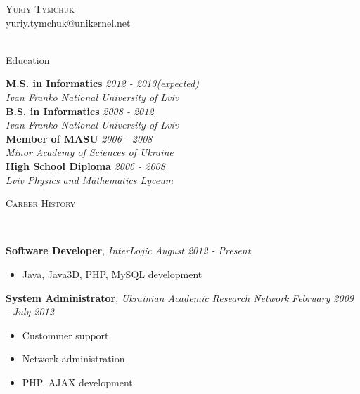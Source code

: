 \documentclass[9pt]{article}
\newenvironment{changemargin}[2]{%
  \begin{list}{}{%
    \setlength{\topsep}{0pt}%
    \setlength{\leftmargin}{#1}%
    \setlength{\rightmargin}{#2}%
    \setlength{\listparindent}{\parindent}%
    \setlength{\itemindent}{\parindent}%
    \setlength{\parsep}{\parskip}%
  }%
  \item[]}{\end{list}
}
\newcommand{\lineover}{
	\begin{changemargin}{-0.05in}{-0.05in}
		\vspace*{-8pt}
		\hrulefill \\
		\vspace*{-2pt}
	\end{changemargin}
}
\newcommand{\header}[1]{
	\begin{changemargin}{-0.5in}{-0.5in}
		\scshape{#1}\\
  	\lineover
	\end{changemargin}
}
\newcommand{\contact}[4]{
	\begin{changemargin}{-0.5in}{-0.5in}
		\begin{center}
			{\Large \scshape {#1}}\\ \smallskip
			{#2}\\ \smallskip 
			{#3}\\ \smallskip
			{#4}\smallskip
		\end{center}
	\end{changemargin}
}
\newenvironment{body} {
	\vspace*{-16pt}
	\begin{changemargin}{-0.25in}{-0.5in}
  }	
	{\end{changemargin}
}
\begin{document}
\contact{Yuriy Tymchuk}{yuriy.tymchuk@unikernel.net}{\hspace*{\fill}}



\header{Education}

\begin{body}
	\vspace{14pt}
	\textbf{M.S. in Informatics} \hfill \emph{2012 - 2013(expected)} \\
	\emph{Ivan Franko National University of Lviv} \\
  \medskip
	\textbf{B.S. in Informatics} \hfill \emph{2008 - 2012} \\
	\emph{Ivan Franko National University of Lviv} \\
  \medskip
	\textbf{Member of MASU} \hfill \emph{2006 - 2008} \\
	\emph{Minor Academy of Sciences of Ukraine} \\
  \medskip
  	\textbf{High School Diploma} \hfill \emph{2006 - 2008} \\
	\emph{Lviv Physics and Mathematics Lyceum} \\
\end{body}

\smallskip


\header{Career History}

\begin{body}
	\vspace{14pt}
	\textbf{Software Developer}, \emph{ InterLogic} \hfill \emph{August 2012 - Present}\\
	\vspace*{-4pt}
	\begin{itemize} \itemsep -0pt
		\item Java, Java3D, PHP, MySQL development
	\end{itemize}
	\textbf{System Administrator}, \emph{Ukrainian Academic Research Network} \hfill \emph{February 2009 - July 2012}\\
	\vspace*{-4pt}
	\begin{itemize} \itemsep -0pt
		\item Custommer support
		\item Network administration
		\item PHP, AJAX development
	\end{itemize}

\end{body}
\end{document}
